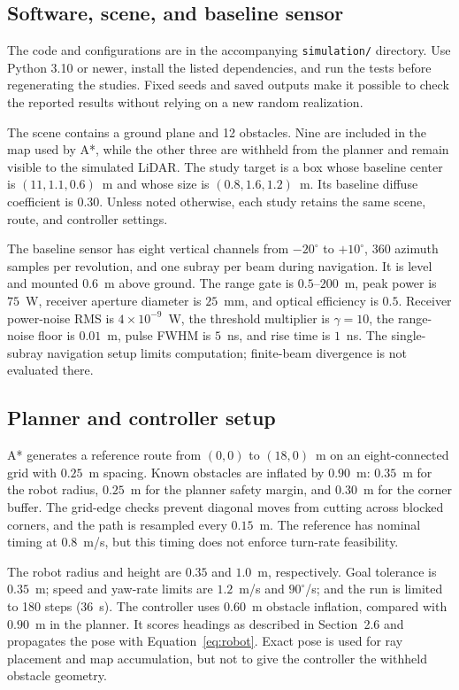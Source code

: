 \documentclass[11pt,letterpaper]{article}
\begin{document}
\subsection{Software, scene, and baseline sensor}
The code and configurations are in the accompanying \texttt{simulation/} directory. Use Python 3.10 or newer, install the listed dependencies, and run the tests before regenerating the studies. Fixed seeds and saved outputs make it possible to check the reported results without relying on a new random realization.

The scene contains a ground plane and 12 obstacles. Nine are included in the map used by A*, while the other three are withheld from the planner and remain visible to the simulated LiDAR. The study target is a box whose baseline center is $(11,1.1,0.6)$~m and whose size is $(0.8,1.6,1.2)$~m. Its baseline diffuse coefficient is $0.30$. Unless noted otherwise, each study retains the same scene, route, and controller settings.

The baseline sensor has eight vertical channels from $-20^\circ$ to $+10^\circ$, 360 azimuth samples per revolution, and one subray per beam during navigation. It is level and mounted $0.6$~m above ground. The range gate is $0.5$--$200$~m, peak power is $75$~W, receiver aperture diameter is $25$~mm, and optical efficiency is $0.5$. Receiver power-noise RMS is $4\times10^{-9}$~W, the threshold multiplier is $\gamma=10$, the range-noise floor is $0.01$~m, pulse FWHM is $5$~ns, and rise time is $1$~ns. The single-subray navigation setup limits computation; finite-beam divergence is not evaluated there.

\subsection{Planner and controller setup}
A* generates a reference route from $(0,0)$ to $(18,0)$~m on an eight-connected grid with $0.25$~m spacing. Known obstacles are inflated by $0.90$~m: $0.35$~m for the robot radius, $0.25$~m for the planner safety margin, and $0.30$~m for the corner buffer. The grid-edge checks prevent diagonal moves from cutting across blocked corners, and the path is resampled every $0.15$~m. The reference has nominal timing at $0.8$~m/s, but this timing does not enforce turn-rate feasibility.

The robot radius and height are $0.35$ and $1.0$~m, respectively. Goal tolerance is $0.35$~m; speed and yaw-rate limits are $1.2$~m/s and $90^\circ$/s; and the run is limited to 180 steps (36~s). The controller uses $0.60$~m obstacle inflation, compared with $0.90$~m in the planner. It scores headings as described in Section~2.6 and propagates the pose with Equation~\eqref{eq:robot}. Exact pose is used for ray placement and map accumulation, but not to give the controller the withheld obstacle geometry.
\end{document}
